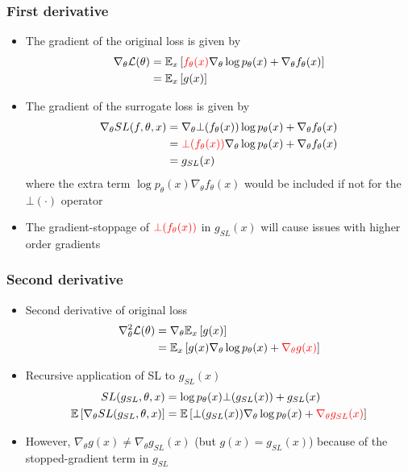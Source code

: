 \documentclass{beamer}
\begin{document}
\begin{frame}
\frametitle{First derivative}
\begin{itemize}
\item The gradient of the original loss is given by
\begin{align*}
\nabla_\theta \mathcal{L}(\theta)
&= \mathbb{E}_{x}\left[\mathbin{\color{red}{f_\theta(x)}}\nabla_\theta \log p_\theta(x) + \nabla_\theta f_\theta(x)\right]\\
&=\mathbb{E}_{x}\left[g(x)\right]
\end{align*}
\item The gradient of the surrogate loss is given by
\begin{align*}
\nabla_\theta SL(f, \theta, x)
&= \nabla_\theta \bot(f_\theta(x))\log p_\theta(x) + \nabla_\theta f_\theta(x)\\
&= \mathbin{\color{red}{\bot(f_\theta(x))}}
    \nabla_\theta \log p_\theta(x) + \nabla_\theta f_\theta(x)\\
&= g_{SL}(x)
\end{align*}
where the extra term $\log p_\theta(x) \nabla_\theta f_\theta(x)$ 
would be included if not for the $\bot(\cdot)$ operator
\item The gradient-stoppage of $\mathbin{\color{red}{\bot(f_\theta(x))}}$ in $g_{SL}(x)$
will cause issues with higher order gradients
\end{itemize}
\end{frame}

\begin{frame}
\frametitle{Second derivative}
\begin{itemize}
\item Second derivative of original loss
\begin{align*}
\nabla^2_\theta \mathcal{L}(\theta) &= \nabla_\theta\mathbb{E}_{x}\left[g(x)\right]\\
&= \mathbb{E}_{x}\left[g(x)\nabla_\theta\log p_\theta(x) + \mathbin{\color{red}{\nabla_\theta g(x)}}\right]
\end{align*}
\item Recursive application of SL to $g_{SL}(x)$
\begin{align*}
SL(g_{SL}, \theta, x) &= \log p_\theta(x)\bot(g_{SL}(x)) + g_{SL}(x)\\
\mathbb{E}\left[\nabla_\theta SL(g_{SL}, \theta, x)\right]
&= \mathbb{E}\left[\bot(g_{SL}(x))\nabla_\theta\log p_\theta(x) + \mathbin{\color{red}{\nabla_\theta g_{SL}(x)}}\right]
\end{align*}
\item However, $\nabla_\theta g(x) \neq \nabla_\theta g_{SL}(x)$
(but $g(x) = g_{SL}(x)$)
because of the stopped-gradient term in $g_{SL}$
\end{itemize}
\end{frame}
\end{document}
